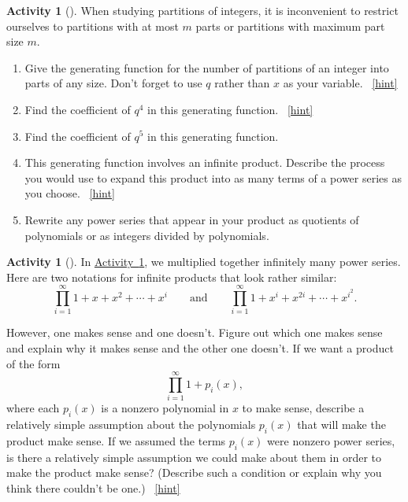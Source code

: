 \documentclass[10pt,]{book}
\theoremstyle{plain}
\theoremstyle{definition}
\theoremstyle{definition}
\theoremstyle{definition}
\newtheorem{activity}[project]{Activity}
\numberwithin{equation}{chapter}
\begin{document}
\begin{activity}[]\label{genfunpartitions}
\hypertarget{p-1580}{}%
When studying partitions of integers, it is inconvenient to restrict ourselves to partitions with at most \(m\) parts or partitions with maximum part size \(m\).%
\begin{enumerate}[font=\bfseries,label=(\alph*),ref=\alph*]
\item\label{task-273} \hypertarget{p-1581}{}%
Give the generating function for the number of partitions of an integer into parts of any size. Don't forget to use \(q\) rather than \(x\) as your variable.%
~\hfill{\tiny\hyperlink{a-319.a}{[hint]}\hypertarget{q-319.a}{}}\item\label{task-274} \hypertarget{p-1584}{}%
Find the coefficient of \(q^4\) in this generating function.%
~\hfill{\tiny\hyperlink{a-319.b}{[hint]}\hypertarget{q-319.b}{}}\item\label{task-275} \hypertarget{p-1587}{}%
Find the coefficient of \(q^5\) in this generating function.%
\item\label{task-276} \hypertarget{p-1589}{}%
This generating function involves an infinite product. Describe the process you would use to expand this product into as many terms of a power series as you choose.%
~\hfill{\tiny\hyperlink{a-319.d}{[hint]}\hypertarget{q-319.d}{}}\item\label{task-277} \hypertarget{p-1592}{}%
Rewrite any power series that appear in your product as quotients of polynomials or as integers divided by polynomials.%
\end{enumerate}
\end{activity}
\begin{activity}[]\label{activity-313}
\hypertarget{p-1594}{}%
In \hyperref[genfunpartitions]{Activity~\ref{genfunpartitions}}, we multiplied together infinitely many power series. Here are two notations for infinite products that look rather similar:%
\begin{equation*}
\prod_{i=1}^\infty 1 + x + x^2 +\cdots+ x^i\qquad\mbox{and}\qquad
\prod_{i=1}^\infty 1 +x^i +x^{2i} +\cdots + x^{i^2}.
\end{equation*}
%
\par
\hypertarget{p-1595}{}%
However, one makes sense and one doesn't. Figure out which one makes sense and explain why it makes sense and the other one doesn't. If we want a product of the form%
\begin{equation*}
\prod_{i=1}^\infty 1 +p_i(x),
\end{equation*}
where each \(p_i(x)\) is a nonzero polynomial in \(x\) to make sense, describe a relatively simple assumption about the polynomials \(p_i(x)\) that will make the product make sense. If we assumed the terms \(p_i(x)\) were nonzero power series, is there a relatively simple assumption we could make about them in order to make the product make sense? (Describe such a condition or explain why you think there couldn't be one.)%
~\hfill{\tiny\hyperlink{a-320}{[hint]}\hypertarget{q-320}{}}\end{activity}
\end{document}

